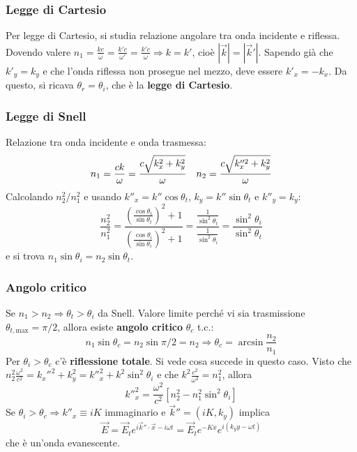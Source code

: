\documentclass[10pt, a4paper]{scrartcl}
\numberwithin{equation}{subsection}
\theoremstyle{style1}
\begin{document}
\subsubsection{Legge di Cartesio}
Per legge di Cartesio, si studia relazione angolare tra onda incidente e riflessa. Dovendo valere $n_1=\frac{kc}{\omega} = \frac{k' c}{\omega'}= \frac{k' c}{\omega}\Rightarrow k = k'$, cio\`e $|\vec{k}| = |\vec{k}'|$. Sapendo gi\`a che $k'_y=k_y$ e che l'onda riflessa non prosegue nel mezzo, deve essere $k'_x = - k_x$. Da questo, si ricava $\theta _r = \theta _i$, che \`e la \textbf{legge di Cartesio}.
\subsubsection{Legge di Snell}

Relazione tra onda incidente e onda trasmessa:
\[
n_1 = \frac{ck}{\omega}=\frac{c \sqrt{k_x ^2 + k_y^2} }{\omega}\; \hspace{.25cm} n_2=\frac{c\sqrt{k''^2_x + k_y^2} }{\omega}
\] 
Calcolando $n^2_2 / n^2_1$ e usando $k''_x = k'' \cos \theta _t$, $k_y = k''\sin\theta _t$ e $k''_y = k_y$: 
\begin{equation}
	\frac{n_2^2}{n_1^2}=\frac{\left(\frac{\cos \theta _t}{\sin\theta  _t}\right) ^2 + 1 }{\left(\frac{\cos \theta _i}{\sin \theta _i}\right) ^2 + 1 } = \frac{\frac{1}{\sin^2 \theta _t}}{\frac{1}{\sin^2 \theta _i}}= \frac{\sin^2 \theta _i}{\sin^2\theta _t}
\end{equation}
e si trova $n_1\sin \theta _i = n_2 \sin \theta  _t$.
\subsubsection{Angolo critico}

Se $n_1 > n_2\Rightarrow \theta _t > \theta _i$ da Snell. Valore limite perch\'e vi sia trasmissione $\theta _{t, \text{max}} = \pi / 2 $, allora esiste \textbf{angolo critico} $\theta _c$ t.c.: 
\begin{equation}
	n_1\sin \theta _c = n_2 \sin \pi /2 = n_2 \Rightarrow \theta _c = \arcsin \frac{n_2}{n_1}
\end{equation}
Per $\theta _i > \theta _c$ c'\`e \textbf{riflessione totale}. Si vede cosa succede in questo caso. Visto che $n_2^2 \frac{\omega^2}{c^2} = k_x''^2 + k_y^2 = k''^2_x + k^2 \sin ^2 \theta _i$ e che $k^2 \frac{c^2}{\omega^2} = n_1^2$, allora
\begin{equation}
	k''^2_x = \frac{\omega^2}{c^2}\left[ n_2^2 - n_1^2 \sin^2 \theta _i  \right] 
\end{equation}
Se $\theta _i > \theta _c\Rightarrow k''_x \equiv iK$ immaginario e $\vec{k}'' = (iK,k_y)$ implica
\begin{equation}
	\vec{E}=\vec{E}_t e^{i \vec{k}'' \cdot \vec{x}- i\omega t}= \vec{E}_t e^{-Kx} e ^{i (k_y y - \omega t)}   
\end{equation}
che \`e un'onda evanescente.
\end{document}
